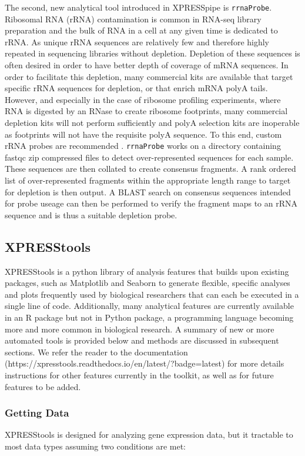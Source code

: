 \documentclass[11pt, a4paper, oneside]{article}
\begin{document}
The second, new analytical tool introduced in XPRESSpipe is \texttt{rrnaProbe}. Ribosomal RNA (rRNA) contamination is common in RNA-seq library preparation and the bulk of RNA in a cell at any given time is dedicated to rRNA. As unique rRNA sequences are relatively few and therefore highly repeated in sequencing libraries without depletion. Depletion of these sequences is often desired in order to have better depth of coverage of mRNA sequences. In order to facilitate this depletion, many commercial kits are available that target specific rRNA sequences for depletion, or that enrich mRNA polyA tails. However, and especially in the case of ribosome profiling experiments, where RNA is digested by an RNase to create ribosome footprints, many commercial depletion kits will not perform sufficiently and polyA selection kits are inoperable as footprints will not have the requisite polyA sequence. To this end, custom rRNA probes are recommended \cite{ingolia_meth, ingolia_science}. \texttt{rrnaProbe} works on a directory containing fastqc \cite{fastqc} zip compressed files to detect over-represented sequences for each sample. These sequences are then collated to create consensus fragments. A rank ordered list of over-represented fragments within the appropriate length range to target for depletion is then output. A BLAST \cite{blast} search on consensus sequences intended for probe useage can then be performed to verify the fragment maps to an rRNA sequence and is thus a suitable depletion probe.

\subsection{XPRESStools}
XPRESStools is a python library of analysis features that builds upon existing packages, such as Matplotlib \cite{matplotlib} and Seaborn \cite{seaborn} to generate flexible, specific analyses and plots frequently used by biological researchers that can each be executed in a single line of code. Additionally, many analytical features are currently available in an R package but not in Python package, a programming language becoming more and more common in biological research. A summary of new or more automated tools is provided below and methods are discussed in subsequent sections. We refer the reader to the documentation (https://xpresstools.readthedocs.io/en/latest/?badge=latest) for more details instructions for other features currently in the toolkit, as well as for future features to be added.

\subsubsection{Getting Data}
XPRESStools is designed for analyzing gene expression data, but it tractable to most data types assuming two conditions are met:
\end{document}

